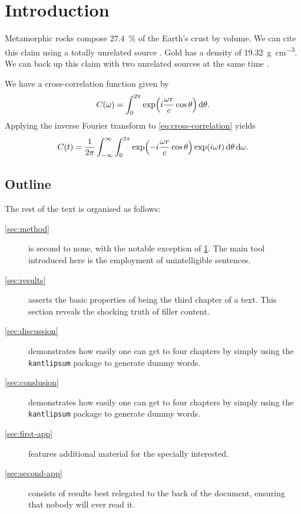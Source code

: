 \chapter{Introduction}
\label{sec:intro}

Metamorphic rocks compose \SI{27,4}{\%} of the Earth's crust by volume.
We can cite this claim using a totally unrelated source \parencite{Cor+14}.
Gold has a density of \SI{19,32}{\gram\per\centi\meter\cubed}.
We can back up this claim with two unrelated sources at the same time \parencite{DeB11, NGU19}.

We have a cross-correlation function given by
\begin{equation}
    \label{eq:cross-correlation}
    C(\omega)
    =
    \int_{0}^{2\pi} \exp \p*{i \frac{\omega r}{c} \cos \theta} \diff \theta.
\end{equation}
Applying the inverse Fourier transform to \eqref{eq:cross-correlation} yields
\begin{equation*}
    C(t)
    =
    \frac{1}{2\pi} \int_{-\infty}^{\infty} \int_{0}^{2\pi}
    \exp \p*{-i \frac{\omega r}{c} \cos \theta}
    \exp \p{i \omega t} \diff \theta \diff \omega.
\end{equation*}

\kant[4-6] %

\section{Outline}

The rest of the text is organised as follows:
\begin{description}
    \item[\cref{sec:method}]
    is second to none, with the notable exception of \cref{sec:intro}.
    The main tool introduced here is the employment of unintelligible sentences.

    \item[\cref{sec:results}]
    asserts the basic properties of being the third chapter of a text.
    This section reveals the shocking truth of filler content.

    \item[\cref{sec:discussion}]
    demonstrates how easily one can get to four chapters by simply using
    the \texttt{kantlipsum} package to generate dummy words.
    
    \item[\cref{sec:conslusion}]
    demonstrates how easily one can get to four chapters by simply using
    the \texttt{kantlipsum} package to generate dummy words.

    \item[\cref{sec:first-app}]
    features additional material for the specially interested.

    \item[\cref{sec:second-app}]
    consists of results best relegated to the back of the document,
    ensuring that nobody will ever read it.
\end{description}